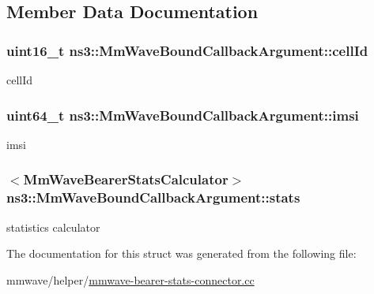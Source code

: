 \subsection{Member Data Documentation}
\subsubsection[{\texorpdfstring{cell\+Id}{cellId}}]{\setlength{\rightskip}{0pt plus 5cm}uint16\+\_\+t ns3\+::\+Mm\+Wave\+Bound\+Callback\+Argument\+::cell\+Id}\hypertarget{structns3_1_1MmWaveBoundCallbackArgument_a90fdb4f4e056b2287ddd6500fa2f86d4}{}\label{structns3_1_1MmWaveBoundCallbackArgument_a90fdb4f4e056b2287ddd6500fa2f86d4}


cell\+Id 

\subsubsection[{\texorpdfstring{imsi}{imsi}}]{\setlength{\rightskip}{0pt plus 5cm}uint64\+\_\+t ns3\+::\+Mm\+Wave\+Bound\+Callback\+Argument\+::imsi}\hypertarget{structns3_1_1MmWaveBoundCallbackArgument_aa4c070833e5f983be05272a0ca4d0a07}{}\label{structns3_1_1MmWaveBoundCallbackArgument_aa4c070833e5f983be05272a0ca4d0a07}


imsi 

\subsubsection[{\texorpdfstring{stats}{stats}}]{$<${\bf Mm\+Wave\+Bearer\+Stats\+Calculator}$>$ ns3\+::\+Mm\+Wave\+Bound\+Callback\+Argument\+::stats}\hypertarget{structns3_1_1MmWaveBoundCallbackArgument_a3bf0a946cc963c0c775a522f43ebbc97}{}\label{structns3_1_1MmWaveBoundCallbackArgument_a3bf0a946cc963c0c775a522f43ebbc97}


statistics calculator 



The documentation for this struct was generated from the following file\+:\begin{DoxyCompactItemize}
\item 
mmwave/helper/\hyperlink{mmwave-bearer-stats-connector_8cc}{mmwave-\/bearer-\/stats-\/connector.\+cc}\end{DoxyCompactItemize}
